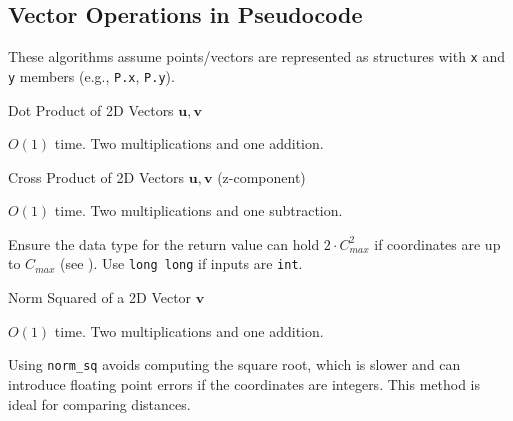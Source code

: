 \subsection{Vector Operations in Pseudocode}
\label{ssec:A.2.1}

These algorithms assume points/vectors are represented as structures with \texttt{x} and \texttt{y} members (e.g., \texttt{P.x}, \texttt{P.y}).

\begin{algorithm}[H]
\caption{Dot Product of 2D Vectors $\mathbf{u}, \mathbf{v}$}
\label{alg:A.2.1.dot_product}
\end{algorithm}
\begin{complexity}
\label{comp:A.2.1.dot_product}
$O(1)$ time. Two multiplications and one addition.
\end{complexity}

\begin{algorithm}[H]
\caption{Cross Product of 2D Vectors $\mathbf{u}, \mathbf{v}$ (z-component)}
\label{alg:A.2.1.cross_product_2d}
\end{algorithm}
\begin{complexity}
\label{comp:A.2.1.cross_product_2d}
$O(1)$ time. Two multiplications and one subtraction.
\end{complexity}
\begin{warning}
\label{warn:A.2.1.cross_product_overflow}
Ensure the data type for the return value can hold $2 \cdot C_{max}^2$ if coordinates are up to $C_{max}$ (see ). Use \texttt{long long} if inputs are \texttt{int}.
\end{warning}

\begin{algorithm}[H]
\caption{Norm Squared of a 2D Vector $\mathbf{v}$}
\label{alg:A.2.1.norm_sq}
\end{algorithm}
\begin{complexity}
\label{comp:A.2.1.norm_sq}
$O(1)$ time. Two multiplications and one addition.
\end{complexity}
\begin{insight}
\label{insight:A.2.1.norm_sq_vs_norm}
Using \texttt{norm\_sq} avoids computing the square root, which is slower and can introduce floating point errors if the coordinates are integers. This method is ideal for comparing distances.
\end{insight}

